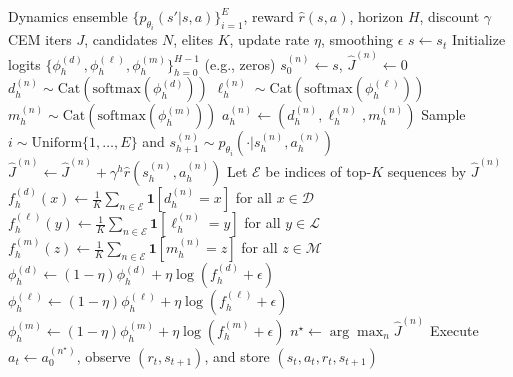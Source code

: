 \documentclass[preprint,12pt]{elsarticle}
\begin{document}
\begin{frontmatter}
\begin{algorithm}[H]
\caption{PETS with Factorized Categorical CEM for Multi-Discrete MPC}
\label{alg:pets_catcem}
\begin{algorithmic}[1]
\Require Dynamics ensemble $\{p_{\theta_i}(s'|s,a)\}_{i=1}^E$, reward $\hat r(s,a)$, horizon $H$, discount $\gamma$
\Require CEM iters $J$, candidates $N$, elites $K$, update rate $\eta$, smoothing $\epsilon$
    \State $s \gets s_t$
    \State Initialize logits $\{\phi^{(d)}_h,\phi^{(\ell)}_h,\phi^{(m)}_h\}_{h=0}^{H-1}$ (e.g., zeros)
            \State $s^{(n)}_0 \gets s$, $\widehat{J}^{(n)} \gets 0$
                \State $d^{(n)}_{h} \sim \mathrm{Cat}(\mathrm{softmax}(\phi^{(d)}_{h}))$
                \State $\ell^{(n)}_{h} \sim \mathrm{Cat}(\mathrm{softmax}(\phi^{(\ell)}_{h}))$
                \State $m^{(n)}_{h} \sim \mathrm{Cat}(\mathrm{softmax}(\phi^{(m)}_{h}))$
                \State $a^{(n)}_{h} \gets (d^{(n)}_{h},\ell^{(n)}_{h},m^{(n)}_{h})$
                \State Sample $i \sim \mathrm{Uniform}\{1,\dots,E\}$ and $s^{(n)}_{h+1} \sim p_{\theta_i}(\cdot|s^{(n)}_h,a^{(n)}_h)$
                \State $\widehat{J}^{(n)} \gets \widehat{J}^{(n)} + \gamma^h \hat r(s^{(n)}_h,a^{(n)}_h)$
            \EndFor
        \EndFor
        \State Let $\mathcal{E}$ be indices of top-$K$ sequences by $\widehat{J}^{(n)}$
            \State $f^{(d)}_h(x) \gets \frac{1}{K}\sum_{n\in\mathcal{E}} \mathbf{1}[d^{(n)}_h=x]$ for all $x\in\mathcal{D}$
            \State $f^{(\ell)}_h(y) \gets \frac{1}{K}\sum_{n\in\mathcal{E}} \mathbf{1}[\ell^{(n)}_h=y]$ for all $y\in\mathcal{L}$
            \State $f^{(m)}_h(z) \gets \frac{1}{K}\sum_{n\in\mathcal{E}} \mathbf{1}[m^{(n)}_h=z]$ for all $z\in\mathcal{M}$
            \State $\phi^{(d)}_h \gets (1-\eta)\phi^{(d)}_h + \eta \log(f^{(d)}_h+\epsilon)$
            \State $\phi^{(\ell)}_h \gets (1-\eta)\phi^{(\ell)}_h + \eta \log(f^{(\ell)}_h+\epsilon)$
            \State $\phi^{(m)}_h \gets (1-\eta)\phi^{(m)}_h + \eta \log(f^{(m)}_h+\epsilon)$
        \EndFor
    \EndFor
    \State $n^\star \gets \arg\max_n \widehat{J}^{(n)}$
    \State Execute $a_t \gets a^{(n^\star)}_{0}$, observe $(r_t,s_{t+1})$, and store $(s_t,a_t,r_t,s_{t+1})$
\EndFor
\end{algorithmic}
\end{algorithm}


\end{frontmatter}
\end{document}
